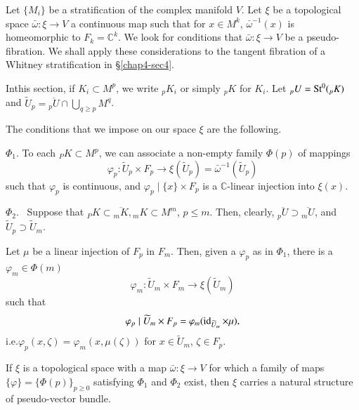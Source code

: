 Let $\{M_{i}\}$ be a stratification of the complex manifold $V$. Let
$\xi$ be a topological space $\bar{\omega}:\xi\to V$ a continuous map
such that for $x\in M^{k}$, $\bar{\omega}^{-1}(x)$ is homeomorphic to
$F_{k}=\mathbb{C}^{k}$. We look for conditions that
$\bar{\omega}:\xi\to V$ be a pseudo-fibration. We shall apply these
considerations to the tangent fibration of a Whitney stratification in
\S \ref{chap4-sec4}.

In\pageoriginale this section, if $K_{i}\subset M^{p}$, we write
${}_{p}K_{i}$ or simply ${}_{p}K$ for $K_{i}$. Let
${}_{p}U=\operatorname{St}^{0}({}_{p}K)$ and
$\widetilde{U}_{p}=\overline{{}_{p}U}\cap \bigcup_{q\geq p}M^{q}$. 

The conditions that we impose on our space $\xi$ are the following.

$\Phi_1$. To each ${}_PK \subset M^p$, we can associate a non-empty
family $\Phi(p)$ of mappings               
$$ 
\varphi_p:\widetilde{U}_p \times F_p \to \xi
(\widetilde{U}_p)=\bar{\omega}^{-1} (\widetilde{U}_p) 
$$            
such that $\varphi_p$ is continuous, and $\varphi_p\mid \{x\}\times F_p$
is a $\mathbb{C}$-linear injection into $\xi(x)$. 

$\Phi_2$.~ Suppose that ${}_PK \subset \overline{{}_{m}K}, {}_mK \subset
M^{m}$, $p \leq m$. Then, clearly, $\overline{{}_{p}U}\supset
\overline{{}_{m}U}$, and $\widetilde{U}_{p}\supset \widetilde{U}_{m}$.
              
Let $\mu$ be a linear injection of $F_{p}$ in $F_{m}$. Then, given a
$\varphi_{p}$ as in $\Phi_{1}$, there is a $\varphi_{m}\in \Phi(m)$
$$
\varphi_{m}:\widetilde{U}_{m}\times F_{m}\to \xi(\widetilde{U}_{m})
$$ 
such that
$$
\varphi_{p}\mid \widetilde{U}_{m}\times
F_{p}=\varphi_{m}(\operatorname{id}_{\widetilde{U}_{m}}\times \mu),
$$
i.e.\quad $\varphi_{p}(x,\zeta)=\varphi_{m}(x,\mu(\zeta))$ for
$x\in\widetilde{U}_{m}$, $\zeta\in F_{p}$. 

\begin{proposition}\label{chap4-prop4} %
If $\xi$ is a topological space with a map $\bar{\omega}:\xi\to V$ for
which a family of maps $\{\varphi\}=\{\Phi(p)\}_{p\geq 0}$ satisfying
$\Phi_{1}$ and $\Phi_{2}$ exist, then $\xi$ carries a natural
structure of pseudo-vector bundle.
\end{proposition} 
   
